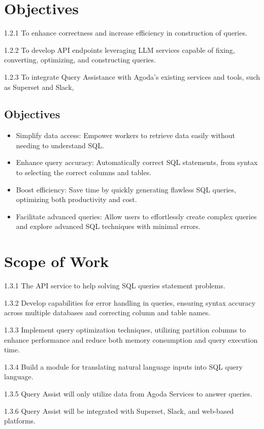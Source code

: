 \section{Objectives}
1.2.1 	To enhance correctness and increase efficiency in construction of queries.

1.2.2 	To develop API endpoints leveraging LLM services capable of fixing, converting, optimizing, and constructing queries.

1.2.3	To integrate Query Assistance with Agoda's existing services and tools, such as Superset and Slack,

        \subsection{Objectives}
        \begin{itemize}
        \item  Simplify data access: Empower workers to retrieve data easily without needing to understand SQL.
        \item  Enhance query accuracy: Automatically correct SQL statements, from syntax to selecting the correct columns and tables.
        \item  Boost efficiency: Save time by quickly generating flawless SQL queries, optimizing both productivity and cost.
        \item  Facilitate advanced queries: Allow users to effortlessly create complex queries and explore advanced SQL techniques with minimal errors.
        \end{itemize}

\section{Scope of Work}
1.3.1	The API service to help solving SQL queries statement problems.

1.3.2	Develop capabilities for error handling in queries, ensuring syntax accuracy across multiple databases and correcting column and table names.

1.3.3	Implement query optimization techniques, utilizing partition columns to enhance performance and reduce both memory consumption and query execution time.

1.3.4	Build a module for translating natural language inputs into SQL query language.

1.3.5	Query Assist will only utilize data from Agoda Services to answer queries.

1.3.6	Query Assist will be integrated with Superset, Slack, and web-based platforms.

